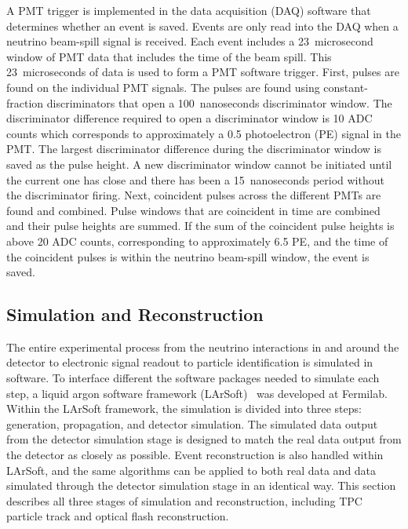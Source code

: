     A PMT trigger is implemented in the data acquisition (DAQ) software that
    determines whether an event is saved. Events are only read into the DAQ
    when a neutrino beam-spill signal is received. Each event includes a
    23~microsecond window of PMT data that includes the time of the beam spill.
    This 23~microseconds of data is used to form a PMT software trigger. First,
    pulses are found on the individual PMT signals. The pulses are found using
    constant-fraction discriminators that open a 100~nanoseconds discriminator
    window. The discriminator difference required to open a discriminator
    window is 10 ADC counts which corresponds to approximately a 0.5
    photoelectron (PE) signal in the PMT. The largest discriminator difference
    during the discriminator window is saved as the pulse height. A new
    discriminator window cannot be initiated until the current one has close
    and there has been a 15~nanoseconds period without the discriminator
    firing.  Next, coincident pulses across the different PMTs are found and
    combined.  Pulse windows that are coincident in time are combined and their
    pulse heights are summed. If the sum of the coincident pulse heights is
    above 20 ADC counts, corresponding to approximately 6.5 PE, and the time of
    the coincident pulses is within the neutrino beam-spill window, the event
    is saved.


\subsection{Simulation and Reconstruction}\label{sec:simreco}
  The entire experimental process from the neutrino interactions in and around
  the detector to electronic signal readout to particle identification is
  simulated in software. To interface different the software packages needed to
  simulate each step, a liquid argon software framework (LArSoft)~\cite{larsoft}
  was developed at Fermilab. Within the LArSoft framework, the simulation is
  divided into three steps: generation, propagation, and detector simulation.
  The simulated data output from the detector simulation stage is designed to
  match the real data output from the detector as closely as possible. Event
  reconstruction is also handled within LArSoft, and the same algorithms can be
  applied to both real data and data simulated through the detector simulation
  stage in an identical way. This section describes all three stages of
  simulation and reconstruction, including TPC particle track and optical flash
  reconstruction.

